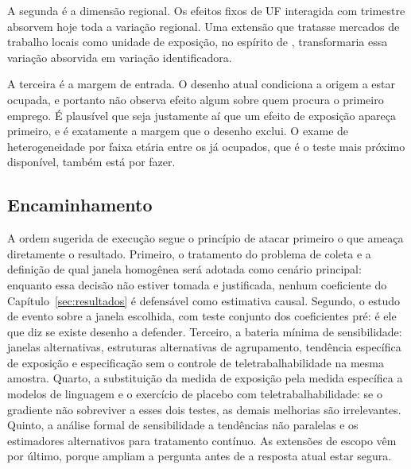 A segunda é a dimensão regional. Os efeitos fixos de UF interagida com trimestre
absorvem hoje toda a variação regional. Uma extensão que tratasse mercados de
trabalho locais como unidade de exposição, no espírito de
, transformaria essa variação absorvida em variação
identificadora.

A terceira é a margem de entrada. O desenho atual condiciona a origem a estar
ocupada, e portanto não observa efeito algum sobre quem procura o primeiro
emprego. É plausível que seja justamente aí que um efeito de exposição apareça
primeiro, e é exatamente a margem que o desenho exclui. O exame de
heterogeneidade por faixa etária entre os já ocupados, que é o teste mais
próximo disponível, também está por fazer.

\subsection{Encaminhamento}

A ordem sugerida de execução segue o princípio de atacar primeiro o que ameaça
diretamente o resultado. Primeiro, o tratamento do problema de coleta e a
definição de qual janela homogênea será adotada como cenário principal: enquanto
essa decisão não estiver tomada e justificada, nenhum coeficiente do
Capítulo~\ref{sec:resultados} é defensável como estimativa causal. Segundo, o
estudo de evento sobre a janela escolhida, com teste conjunto dos coeficientes
pré: é ele que diz se existe desenho a defender. Terceiro, a bateria mínima de
sensibilidade: janelas alternativas, estruturas alternativas de agrupamento,
tendência específica de exposição e especificação sem o controle de
teletrabalhabilidade na mesma amostra. Quarto, a substituição da medida de
exposição pela medida específica a modelos de linguagem e o exercício de placebo
com teletrabalhabilidade: se o gradiente não sobreviver a esses dois testes, as
demais melhorias são irrelevantes. Quinto, a análise formal de sensibilidade a
tendências não paralelas e os estimadores alternativos para tratamento contínuo.
As extensões de escopo vêm por último, porque ampliam a pergunta antes de a
resposta atual estar segura.

